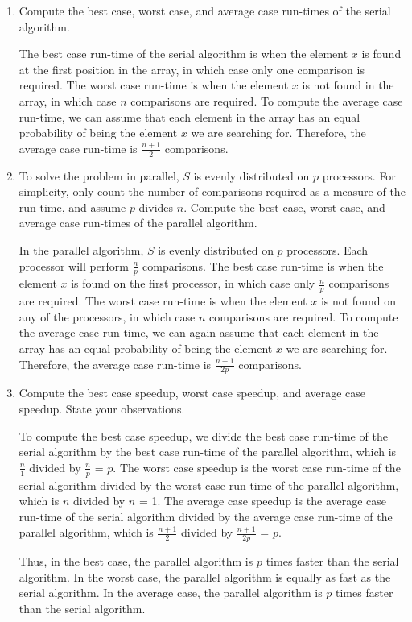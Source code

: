 \documentclass[twoside,10pt]{article}
\begin{document}
\begin{enumerate}[label=(\alph*)]
\item Compute the best case, worst case, and average case run-times of the serial algorithm.

The best case run-time of the serial algorithm is when the element $x$ is found at the first position in the array, in which case only one comparison is required.
The worst case run-time is when the element $x$ is not found in the array, in which case $n$ comparisons are required.
To compute the average case run-time, we can assume that each element in the array has an equal probability of being the element $x$ we are searching for.
Therefore, the average case run-time is $\frac{n+1}{2}$ comparisons.

\item To solve the problem in parallel, $S$ is evenly distributed on $p$ processors.
For simplicity, only count the number of comparisons required as a measure of the run-time, and assume $p$ divides $n$.
Compute the best case, worst case, and average case run-times of the parallel algorithm.

In the parallel algorithm, $S$ is evenly distributed on $p$ processors.
Each processor will perform $\frac{n}{p}$ comparisons.
The best case run-time is when the element $x$ is found on the first processor, in which case only $\frac{n}{p}$ comparisons are required.
The worst case run-time is when the element $x$ is not found on any of the processors, in which case $n$ comparisons are required.
To compute the average case run-time, we can again assume that each element in the array has an equal probability of being the element $x$ we are searching for.
Therefore, the average case run-time is $\frac{n+1}{2p}$ comparisons.

\item Compute the best case speedup, worst case speedup, and average case speedup. State your observations.

To compute the best case speedup, we divide the best case run-time of the serial algorithm by the best case run-time of the parallel algorithm, which is $\frac{n}{1}$ divided by $\frac{n}{p}$ = $p$.
The worst case speedup is the worst case run-time of the serial algorithm divided by the worst case run-time of the parallel algorithm, which is $n$ divided by $n$ = 1.
The average case speedup is the average case run-time of the serial algorithm divided by the average case run-time of the parallel algorithm, which is $\frac{n+1}{2}$ divided by $\frac{n+1}{2p}$ = $p$.

Thus, in the best case, the parallel algorithm is $p$ times faster than the serial algorithm.
In the worst case, the parallel algorithm is equally as fast as the serial algorithm.
In the average case, the parallel algorithm is $p$ times faster than the serial algorithm.

\end{enumerate}
\end{document}
